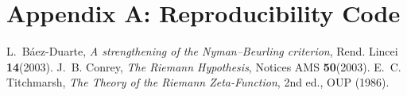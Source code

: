 \documentclass[11pt]{article}
\theoremstyle{remark}
\begin{document}
\appendix
\section{Appendix A: Reproducibility Code}


\begin{thebibliography}{9}
 L.~B\'aez-Duarte, \emph{A strengthening of the Nyman--Beurling criterion}, Rend. Lincei \textbf{14}(2003).
 J.~B. Conrey, \emph{The Riemann Hypothesis}, Notices AMS \textbf{50}(2003).
 E.~C. Titchmarsh, \emph{The Theory of the Riemann Zeta-Function}, 2nd ed., OUP (1986).
\end{thebibliography}
\end{document}
